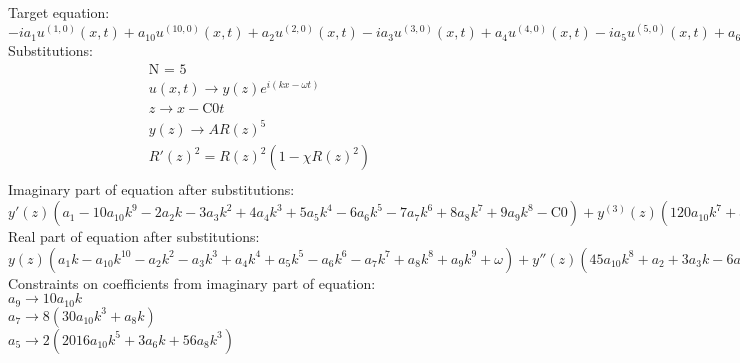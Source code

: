 \documentclass[12pt,a4paper,draft]{article}
\begin{document}
Target equation:
\\$
-i a_{1} u^{(1,0)}(x,t)+a_{10} u^{(10,0)}(x,t)+a_{2} u^{(2,0)}(x,t)-i a_{3} u^{(3,0)}(x,t)+a_{4} u^{(4,0)}(x,t)-i a_{5} u^{(5,0)}(x,t)+a_{6} u^{(6,0)}(x,t)-i a_{7} u^{(7,0)}(x,t)+a_{8} u^{(8,0)}(x,t)-i a_{9} u^{(9,0)}(x,t)-b u(x,t) \left| u(x,t)\right| ^2+i u^{(0,1)}(x,t)=0
$\\
Substitutions:
$$
\begin{array}{c}
 \text{N = 5} \\
 u(x,t)\to y(z) e^{i (k x-\omega  t)} \\
 z\to x-\text{C0} t \\
 y(z)\to A R(z)^5 \\
 R'(z)^2=R(z)^2 \left(1-\chi  R(z)^2\right) \\
\end{array}
$$
Imaginary part of equation after substitutions:
\\$
y'(z) \left(a_{1}-10 a_{10} k^9-2 a_{2} k-3 a_{3} k^2+4 a_{4} k^3+5 a_{5} k^4-6 a_{6} k^5-7 a_{7} k^6+8 a_{8} k^7+9 a_{9} k^8-\text{C0}\right)+y^{(3)}(z) \left(120 a_{10} k^7+a_{3}-4 a_{4} k-10 a_{5} k^2+20 a_{6} k^3+35 a_{7} k^4-56 a_{8} k^5-84 a_{9} k^6\right)-252 a_{10} k^5 y^{(5)}(z)+120 a_{10} k^3 y^{(7)}(z)-10 a_{10} k y^{(9)}(z)+a_{5} y^{(5)}(z)-6 a_{6} k y^{(5)}(z)-21 a_{7} k^2 y^{(5)}(z)+a_{7} y^{(7)}(z)+56 a_{8} k^3 y^{(5)}(z)-8 a_{8} k y^{(7)}(z)+126 a_{9} k^4 y^{(5)}(z)-36 a_{9} k^2 y^{(7)}(z)+a_{9} y^{(9)}(z)=0
$\\
Real part of equation after substitutions:
\\$
y(z) \left(a_{1} k-a_{10} k^{10}-a_{2} k^2-a_{3} k^3+a_{4} k^4+a_{5} k^5-a_{6} k^6-a_{7} k^7+a_{8} k^8+a_{9} k^9+\omega \right)+y''(z) \left(45 a_{10} k^8+a_{2}+3 a_{3} k-6 a_{4} k^2-10 a_{5} k^3+15 a_{6} k^4+21 a_{7} k^5-28 a_{8} k^6-36 a_{9} k^7\right)-210 a_{10} k^6 y^{(4)}(z)+210 a_{10} k^4 y^{(6)}(z)-45 a_{10} k^2 y^{(8)}(z)+a_{10} y^{(10)}(z)+a_{4} y^{(4)}(z)+5 a_{5} k y^{(4)}(z)-15 a_{6} k^2 y^{(4)}(z)+a_{6} y^{(6)}(z)-35 a_{7} k^3 y^{(4)}(z)+7 a_{7} k y^{(6)}(z)+70 a_{8} k^4 y^{(4)}(z)-28 a_{8} k^2 y^{(6)}(z)+a_{8} y^{(8)}(z)+126 a_{9} k^5 y^{(4)}(z)-84 a_{9} k^3 y^{(6)}(z)+9 a_{9} k y^{(8)}(z)-b y(z)^3=0
$\\
Constraints on coefficients from imaginary part of equation:
\\$a_{9}\to 10 a_{10} k$\\
$a_{7}\to 8 \left(30 a_{10} k^3+a_{8} k\right)$\\
$a_{5}\to 2 \left(2016 a_{10} k^5+3 a_{6} k+56 a_{8} k^3\right)$\\
\end{document}
